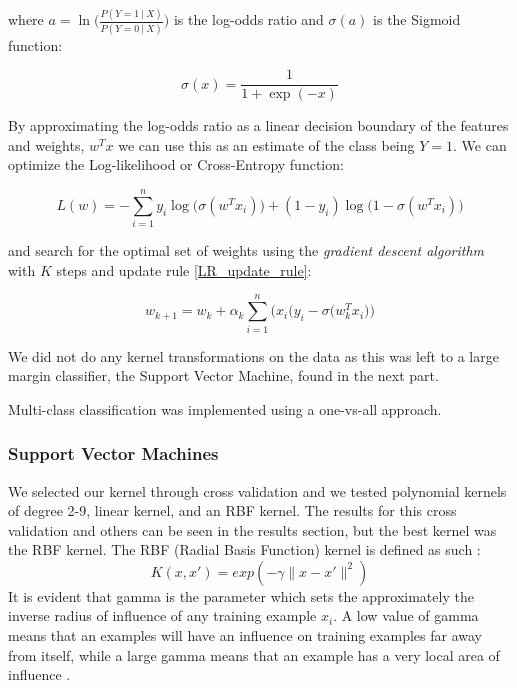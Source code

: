 \documentclass[conference]{IEEEtran}
\begin{document}
where $a=\ln\Big(\frac{P(Y=1~|~X)}{P(Y=0~|~X)}\Big)$ is the log-odds ratio and $\sigma (a)$ is the Sigmoid function:

\begin{equation}
	\label{sig}
	\sigma (x)= \frac{1}{1 + \exp{(-x)}} 
\end{equation}

By approximating the log-odds ratio as a linear decision boundary of the features and weights, $w^T x$ we can use this as an estimate of the class being $Y=1$. We can optimize the Log-likelihood or Cross-Entropy function:

\begin{equation}
	\label{LL}
	L(w) = -\sum_{i=1}^n y_i\log\Big(\sigma(w^Tx_i)\Big) + (1-y_i)\log\Big(1-\sigma(w^Tx_i)\Big)
\end{equation}

and search for the optimal set of weights using the \emph{gradient descent algorithm} with $K$ steps and update rule \ref{LR_update_rule}:

\begin{equation}
\label{LR_update_rule}
	w_{k+1} = w_k + \alpha_k \sum_{i=1}^n \Big( x_i\big(y_i - \sigma(w_k^Tx_i\big) \Big)
\end{equation}

We did not do any kernel transformations on the data as this was left to a large margin classifier, the Support Vector Machine,  found in the next part.

Multi-class classification was implemented using a one-vs-all approach.

\subsubsection{Support Vector Machines}
We selected our kernel through cross validation and we tested polynomial kernels of degree 2-9, linear kernel, and an RBF kernel. The results for this cross validation and others can be seen in the results section, but the best kernel was the RBF kernel. The RBF (Radial Basis Function) kernel is defined as such \cite{Hastie}: \[K(x,x\prime )=exp(-\gamma\|x-x\prime \|^2)\] It is evident that gamma is the parameter which sets the approximately the inverse radius of influence of any training example $x_i$. A low value of gamma means that an examples will have an influence on training examples far away from itself, while a large gamma means that an example has a very local area of influence \cite{sklearn}.
\end{document}
